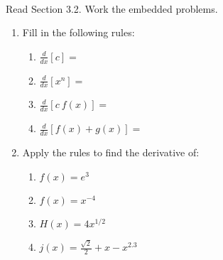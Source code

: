 \documentclass[11pt,fleqn]{article}
\begin{document}
\renewcommand{\headrulewidth}{0pt}
\newcommand{\blank}[1]{\rule{#1}{0.75pt}}
\newcommand{\bc}{\begin{center}}
\newcommand{\ec}{\end{center}}
\renewcommand{\d}{\displaystyle}

\vspace*{-0.7in}

\begin{center}
  \large
  \\
\end{center}
Read Section 3.2. Work the embedded problems. \\
\hrulefill

\begin{enumerate}
\item Fill in the following rules:\\
	\begin{multicols}{2}
	\begin{enumerate}
	\item $\displaystyle{\frac{d}{dx}\left[c\right]=}$\\

	\item $\displaystyle{\frac{d}{dx}\left[x^n\right]=}$\\

	\item $\displaystyle{\frac{d}{dx}\left[c\:f(x)\right]=}$\\

	\item $\displaystyle{\frac{d}{dx}\left[f(x) + g(x)\right]=}$\\

	\end{enumerate}
	\end{multicols}
\item Apply the rules to find the derivative of:
	\begin{multicols}{2}
	\begin{enumerate}
	\item $\displaystyle{f(x)=e^3}$\\

	\item $\displaystyle{f(x)=x^{-4}}$\\

	\item $\displaystyle{H(x)=4x^{1/2}}$\\

	\item $\displaystyle{j(x)=\frac{\sqrt{2}}{2}+x-x^{2.3}}$\\


\end{enumerate}
\end{multicols}
\end{enumerate}
\end{document}
